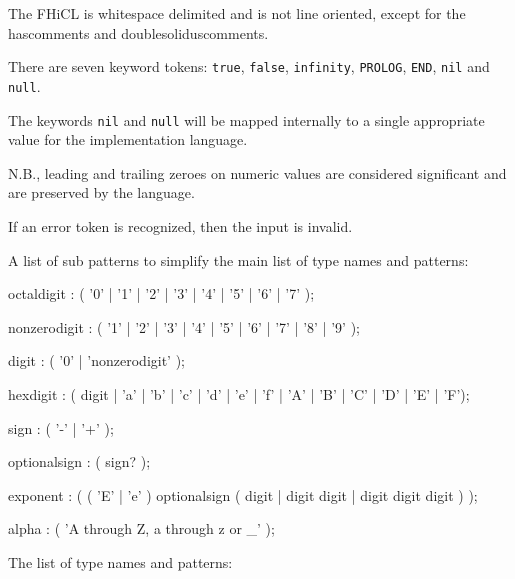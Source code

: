 \documentclass[twoside]{memarticle}
\begin{document}
The FHiCL is whitespace delimited and is not line oriented,
except for the hascomments and doublesoliduscomments.

There are seven keyword tokens:
\texttt{true}, \texttt{false}, \texttt{infinity}, \texttt{PROLOG}, \texttt{END},
\texttt{nil} and \texttt{null}.

The keywords \texttt{nil} and \texttt{null} will be mapped internally
to a single appropriate value for the implementation language.

N.B., leading and trailing zeroes on numeric values are considered
significant and are preserved by the language.

If an error token is recognized, then the input is invalid.

A list of sub patterns to simplify the main list of
type names and patterns:

\begin{rail} 
octaldigit : ( '0' | '1' | '2' | '3' | '4' | '5' | '6' | '7' );
\end{rail}

\begin{rail} 
nonzerodigit : ( '1' | '2' | '3' | '4' | '5' | '6' | '7' | '8' | '9' );
\end{rail}

\begin{rail} 
digit : ( '0' | 'nonzerodigit' );
\end{rail}

\begin{rail} 
hexdigit : ( digit | 'a' | 'b' | 'c' | 'd' | 'e' | 'f'
                   | 'A' | 'B' | 'C' | 'D' | 'E' | 'F');
\end{rail}

\begin{rail} 
sign : ( '-' | '+' );
\end{rail}

\begin{rail} 
optionalsign : ( sign? );
\end{rail}

\begin{rail} 
exponent : ( ( 'E' | 'e' ) optionalsign
             ( digit | digit digit | digit digit digit ) );
\end{rail}

\begin{rail}
alpha : ( 'A through Z, a through z or \_' );
\end{rail}

The list of type names and patterns:
\end{document}

